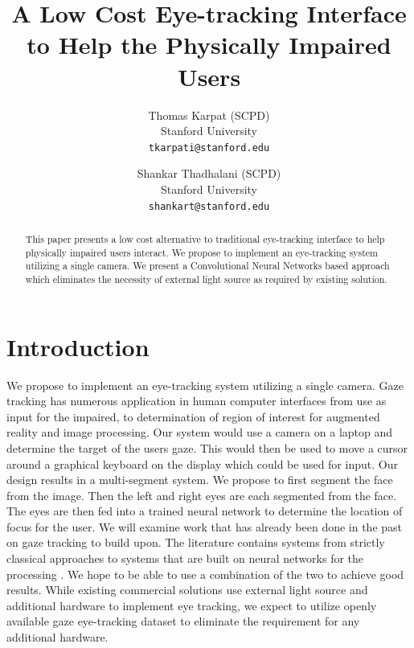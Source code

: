\documentclass[10pt,twocolumn,letterpaper]{article}
\begin{document}
\title{A Low Cost Eye-tracking Interface to Help the Physically
  Impaired Users}

\author{Thomas Karpat (SCPD)\\
Stanford University \\
{\tt\small tkarpati@stanford.edu}
\and
Shankar Thadhalani (SCPD)\\
Stanford University \\
{\tt\small shankart@stanford.edu}
}

\maketitle

\begin{abstract}
This paper presents a low cost alternative to traditional eye-tracking
interface to help physically impaired users interact. We propose to
implement an eye-tracking system utilizing a single camera. We present a
Convolutional Neural Networks based approach which eliminates the
necessity of external light source as required by existing solution.
\end{abstract}

\section{Introduction}
We propose to implement an eye-tracking system utilizing a single
camera. Gaze tracking has numerous application in human computer
interfaces from use as input for the impaired\cite{calvo}, to
determination of region of interest for augmented reality and image
processing. Our system would use a camera on a laptop and determine
the target of the users gaze. This would then be used to move a cursor
around a graphical keyboard on the display which could be used for
input. Our design results in a multi-segment system. We propose to
first segment the face from the image. Then the left and right eyes
are each segmented from the face. The eyes are then fed into a trained
neural network to determine the location of focus for the user. We
will examine work that has already been done in the past on gaze
tracking to build upon. The literature contains systems from strictly
classical approaches to systems that are built on neural networks for
the processing \cite{krafka} \cite{mcmurrough} \cite{weidenbacher}
\cite{baluja} \cite{cazzato} \cite{li}. We hope to be able to use a
combination of the two to achieve good results. While existing
commercial solutions use external light source and additional hardware
to implement eye tracking, we expect to utilize openly available gaze
eye-tracking dataset to eliminate the requirement for any additional
hardware.
\end{document}
